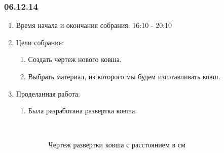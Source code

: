\subsubsection{06.12.14}

\begin{enumerate}
	\item Время начала и окончания собрания:
	16:10 - 20:10
	\item Цели собрания:
	\begin{enumerate}
	  \item Создать чертеж нового ковша.
	  
	  \item Выбрать материал, из которого мы будем изготавливать ковш.
	  
    \end{enumerate}
	\item Проделанная работа:
	\begin{enumerate}
	  \item Была разработана развертка ковша.
	  
	  \begin{figure}[H]
	  	\begin{minipage}[h]{0.2\linewidth}
	  		\center  
	  	\end{minipage}
	  	\begin{minipage}[h]{0.6\linewidth}
	  		\caption{Чертеж развертки ковша с расстоянием в см}
	  	\end{minipage}
	  \end{figure}
	  

\end{enumerate}
\end{enumerate}
